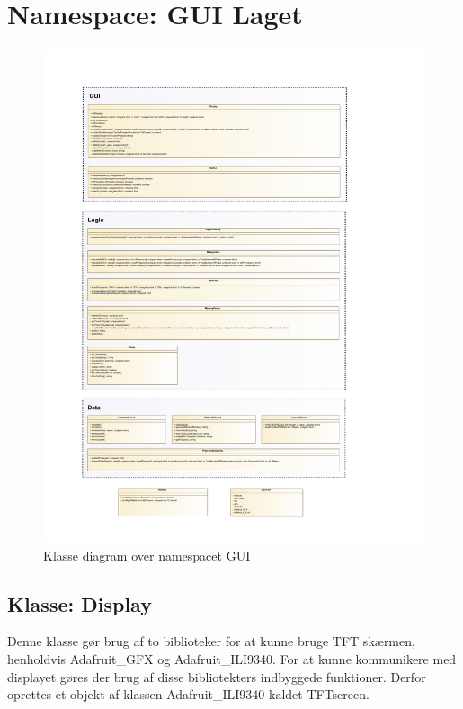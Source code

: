 \section{Namespace: GUI Laget}

\begin{figure}[H]
	\includegraphics[width=\textwidth]{Implementeringsdokument/klassediagram_GUI-crop.pdf}
	\caption{Klasse diagram over namespacet GUI}\label{fig:classDiagramGUI}
\end{figure}

\subsection{Klasse: Display}
Denne klasse gør brug af to biblioteker for at kunne bruge TFT skærmen, henholdvis Adafruit\_GFX og Adafruit\_ILI9340. For at kunne kommunikere med displayet gøres der brug af disse bibliotekters indbyggede funktioner. Derfor oprettes et objekt af klassen Adafruit\_ILI9340 kaldet TFTscreen.

